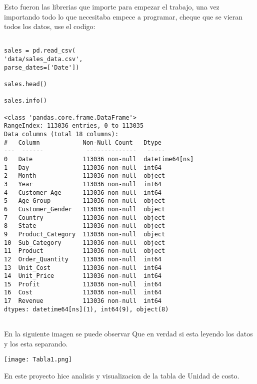 \documentclass[
	12pt, %
]{fphw}
\begin{document}
Esto fueron las librerias que importe para empezar el trabajo, una vez importando todo lo que necesitaba empece a programar, cheque que se vieran todos los datos, use el codigo:

\lstset{language=Python}
\lstset{frame=lines}
\lstset{basicstyle=\footnotesize}
\begin{lstlisting}

sales = pd.read_csv(
'data/sales_data.csv',
parse_dates=['Date'])

sales.head()

sales.info()

<class 'pandas.core.frame.DataFrame'>
RangeIndex: 113036 entries, 0 to 113035
Data columns (total 18 columns):
#   Column            Non-Null Count   Dtype         
---  ------            --------------   -----         
0   Date              113036 non-null  datetime64[ns]
1   Day               113036 non-null  int64         
2   Month             113036 non-null  object        
3   Year              113036 non-null  int64         
4   Customer_Age      113036 non-null  int64         
5   Age_Group         113036 non-null  object        
6   Customer_Gender   113036 non-null  object        
7   Country           113036 non-null  object        
8   State             113036 non-null  object        
9   Product_Category  113036 non-null  object        
10  Sub_Category      113036 non-null  object        
11  Product           113036 non-null  object        
12  Order_Quantity    113036 non-null  int64         
13  Unit_Cost         113036 non-null  int64         
14  Unit_Price        113036 non-null  int64         
15  Profit            113036 non-null  int64         
16  Cost              113036 non-null  int64         
17  Revenue           113036 non-null  int64         
dtypes: datetime64[ns](1), int64(9), object(8)


\end{lstlisting}
En la siguiente imagen se puede observar Que en verdad si esta leyendo los datos y los esta separando.

\begin{center}
	\texttt{[image: Tabla1.png]} %
\end{center}

En este proyecto hice analisis y visualizacion de la tabla de Unidad de costo.
\end{document}
